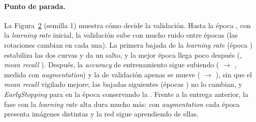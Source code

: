 \paragraph{Punto de parada.} La Figura~\ref{fig:stopping} (semilla 1) muestra cómo decide la validación. Hasta la
época , con la \emph{learning rate} inicial, la validación sube con mucho ruido entre
épocas (las rotaciones cambian en cada una). La primera bajada de la \emph{learning rate} (época
) estabiliza las dos curvas y da un salto, y la mejor época llega poco después
(, \emph{mean recall} ). Después, la \emph{accuracy} de entrenamiento
sigue subiendo ( $\rightarrow$ , medida con \emph{augmentation}) y
la de validación apenas se mueve ( $\rightarrow$ ), sin que el
\emph{mean recall} vigilado mejore; las bajadas siguientes (épocas ) no lo cambian, y
\emph{EarlyStopping} para en la época  conservando la . Frente a la entrega
anterior, la fase con la \emph{learning rate} alta dura mucho más: con \emph{augmentation} cada época presenta
imágenes distintas y la red sigue aprendiendo de ellas.

\begin{figure}[!htbp]
  \centering
  \begin{minipage}[t]{0.485\linewidth}
    \centering
    \caption{}
    \label{fig:progress}
  \end{minipage}\hfill
  \begin{minipage}[t]{0.485\linewidth}
    \centering
    \caption{}
    \label{fig:curves}
  \end{minipage}
\end{figure}

\begin{figure}[!htbp]
  \centering
  \caption{}
  \label{fig:stopping}
\end{figure}

